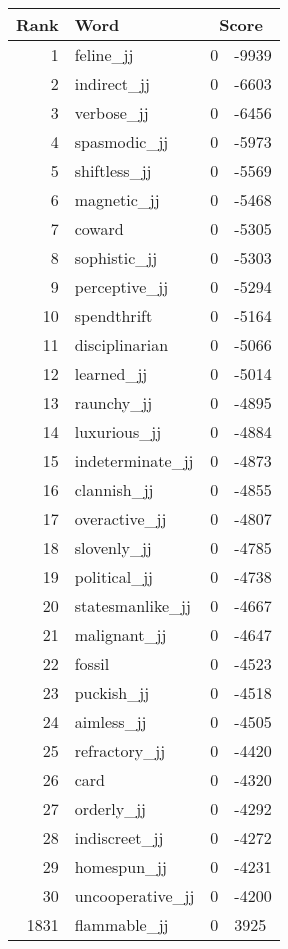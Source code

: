 \begin{longtable}[!htbp]{| rlr@{.}l |}
    \hline
    \textbf{Rank} & \textbf{Word} & \multicolumn{2}{c|}{\textbf{Score}} \\
    \hline
    \endhead
    1 & feline\_jj & 0 & -9939 \\
    2 & indirect\_jj & 0 & -6603 \\
    3 & verbose\_jj & 0 & -6456 \\
    4 & spasmodic\_jj & 0 & -5973 \\
    5 & shiftless\_jj & 0 & -5569 \\
    6 & magnetic\_jj & 0 & -5468 \\
    7 & coward & 0 & -5305 \\
    8 & sophistic\_jj & 0 & -5303 \\
    9 & perceptive\_jj & 0 & -5294 \\
    10 & spendthrift & 0 & -5164 \\
    11 & disciplinarian & 0 & -5066 \\
    12 & learned\_jj & 0 & -5014 \\
    13 & raunchy\_jj & 0 & -4895 \\
    14 & luxurious\_jj & 0 & -4884 \\
    15 & indeterminate\_jj & 0 & -4873 \\
    16 & clannish\_jj & 0 & -4855 \\
    17 & overactive\_jj & 0 & -4807 \\
    18 & slovenly\_jj & 0 & -4785 \\
    19 & political\_jj & 0 & -4738 \\
    20 & statesmanlike\_jj & 0 & -4667 \\
    21 & malignant\_jj & 0 & -4647 \\
    22 & fossil & 0 & -4523 \\
    23 & puckish\_jj & 0 & -4518 \\
    24 & aimless\_jj & 0 & -4505 \\
    25 & refractory\_jj & 0 & -4420 \\
    26 & card & 0 & -4320 \\
    27 & orderly\_jj & 0 & -4292 \\
    28 & indiscreet\_jj & 0 & -4272 \\
    29 & homespun\_jj & 0 & -4231 \\
    30 & uncooperative\_jj & 0 & -4200 \\
    1831 & flammable\_jj & 0 & 3925 \\

\end{longtable}
